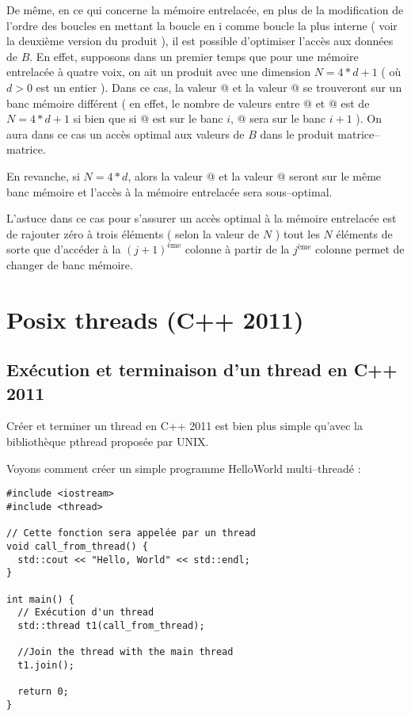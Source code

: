 \documentclass[fleqn,11pt]{article}
\begin{document}
De même, en ce qui concerne la mémoire entrelacée, en plus de la modification de l'ordre des boucles en mettant la boucle en i
comme boucle la plus interne ( voir la deuxième version du produit ), 
il est possible d'optimiser l'accès aux données de $B$. En effet, supposons dans un premier temps
que pour une mémoire entrelacée à quatre voix, on ait un produit avec une dimension $N=4*d+1$ ( où $d>0$ est un entier ).
Dans ce cas, la valeur \lstinline@B[k+j*N]@ et la valeur \lstinline@B[k+(j+1)*N]@ se trouveront sur un banc mémoire différent
( en effet, le nombre de valeurs entre  \lstinline@B[k+j*N]@ et \lstinline@B[k+(j+1)*N]@ est de 
$N=4*d+1$ si bien que si \lstinline@B[k+j*N]@ est sur le banc $i$, \lstinline@B[k+(j+1)*N]@ sera sur le banc $i+1$ ). On
aura dans ce cas un accès optimal aux valeurs de $B$ dans le produit matrice--matrice.

En revanche, si $N=4*d$, alors la valeur \lstinline@B[k+j*N]@ et la valeur \lstinline@B[k+(j+1)*N]@ seront sur le même banc mémoire
et l'accès à la mémoire entrelacée sera sous--optimal.

L'astuce dans ce cas pour s'assurer un accès optimal à la mémoire entrelacée est de rajouter zéro à trois éléments ( selon la valeur de $N$ )
tout les $N$ éléments de sorte que d'accéder à la $(j+1)^{\mbox{ème}}$ colonne à partir de la  $j^{\mbox{ème}}$ colonne permet de changer de
banc mémoire.

\section{Posix threads (C++ 2011)}

\subsection{Exécution et terminaison d'un thread en C++ 2011}

Créer et terminer un thread en C++ 2011 est bien plus simple qu'avec la bibliothèque
pthread proposée par UNIX.

Voyons comment créer un simple programme HelloWorld multi--threadé :

\begin{lstlisting}
#include <iostream>
#include <thread>

// Cette fonction sera appelée par un thread
void call_from_thread() {
  std::cout << "Hello, World" << std::endl;
}

int main() {
  // Exécution d'un thread
  std::thread t1(call_from_thread);

  //Join the thread with the main thread
  t1.join();

  return 0;
}
\end{lstlisting}
\end{document}
